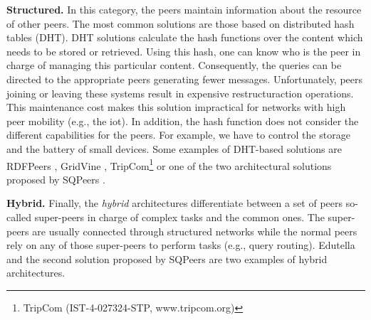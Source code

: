 \noindent\textbf{Structured.}
In this category, the peers  maintain information about the resource of other peers.
The most common solutions are those based on distributed hash tables (DHT).
DHT solutions calculate the hash functions over the content which needs to be stored or retrieved.
Using this hash, one can know who is the peer in charge of managing this particular content.
Consequently, the queries can be directed to the appropriate peers generating fewer messages.
Unfortunately, peers joining or leaving these systems result in expensive restructuraction operations.
This maintenance cost makes this solution impractical for networks with high peer mobility (e.g., the \ac{iot}).
In addition, the hash function does not consider the different capabilities for the peers.
For example, we have to control the storage and the battery of small devices.
Some examples of DHT-based solutions are
RDFPeers \citep{cai_rdfpeers:_2004},
GridVine \citep{cudre-mauroux_gridvine:_2007},
TripCom\footnote{TripCom (IST-4-027324-STP, www.tripcom.org)}
or one of the two architectural solutions proposed by SQPeers \citep{kokkinidis_query_2006}.

\noindent\textbf{Hybrid.}
Finally, the \emph{hybrid} architectures differentiate between a set of peers so-called super-peers in charge of complex tasks and the common ones.
The super-peers are usually connected through structured networks while the normal peers rely on any of those super-peers to perform tasks (e.g., query routing).
Edutella \citep{nejdl_super-peer-based_2003} and the second solution proposed by SQPeers \citep{kokkinidis_query_2006} are two examples of hybrid architectures.

